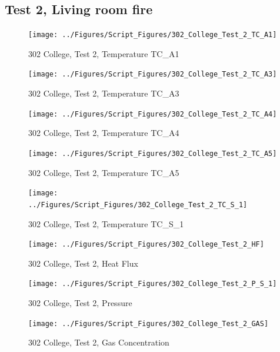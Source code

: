 \documentclass[12pt,oneside]{book}
\begin{document}
\clearpage


\subsection{Test 2, Living room fire}

\begin{figure}[!ht]
\texttt{[image: ../Figures/Script\_Figures/302\_College\_Test\_2\_TC\_A1]}
\caption{302 College, Test 2, Temperature TC\_A1}
\label{fig:302_College_Test_2_TC_A1}
\end{figure}

\begin{figure}[!ht]
\texttt{[image: ../Figures/Script\_Figures/302\_College\_Test\_2\_TC\_A3]}
\caption{302 College, Test 2, Temperature TC\_A3}
\label{fig:302_College_Test_2_TC_A3}
\end{figure}

\begin{figure}[!ht]
\texttt{[image: ../Figures/Script\_Figures/302\_College\_Test\_2\_TC\_A4]}
\caption{302 College, Test 2, Temperature TC\_A4}
\label{fig:302_College_Test_2_TC_A4}
\end{figure}

\begin{figure}[!ht]
\texttt{[image: ../Figures/Script\_Figures/302\_College\_Test\_2\_TC\_A5]}
\caption{302 College, Test 2, Temperature TC\_A5}
\label{fig:302_College_Test_2_TC_A5}
\end{figure}

\begin{figure}[!ht]
\texttt{[image: ../Figures/Script\_Figures/302\_College\_Test\_2\_TC\_S\_1]}
\caption{302 College, Test 2, Temperature TC\_S\_1}
\label{fig:302_College_Test_2_TC_S_1}
\end{figure}

\begin{figure}[!ht]
\texttt{[image: ../Figures/Script\_Figures/302\_College\_Test\_2\_HF]}
\caption{302 College, Test 2, Heat Flux}
\label{fig:302_College_Test_2_HF}
\end{figure}

\begin{figure}[!ht]
\texttt{[image: ../Figures/Script\_Figures/302\_College\_Test\_2\_P\_S\_1]}
\caption{302 College, Test 2, Pressure}
\label{fig:302_College_Test_2_P_S_1}
\end{figure}

\begin{figure}[!ht]
\texttt{[image: ../Figures/Script\_Figures/302\_College\_Test\_2\_GAS]}
\caption{302 College, Test 2, Gas Concentration}
\label{fig:302_College_Test_2_GAS}
\end{figure}
\end{document}
